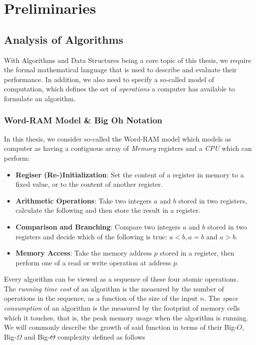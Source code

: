 \clearpage

\def\chaptertitle{Preliminaries}

\lhead{\emph{\chaptertitle}}

\chapter{\chaptertitle}
\label{ch:preliminaries}

\section{Analysis of Algorithms}
\label{sec:anaylsis-of-algorithms}

With Algorithms and Data Structures being a core topic of this thesis, we require the formal mathematical language that is used to describe and evaluate their performance. In addition, we also need to specify a so-called model of computation, which defines the set of \textit{operations} a computer has available to formulate an algorithm.

\subsection{Word-RAM Model \& Big Oh Notation}
In this thesis, we consider so-called the Word-RAM model \cite{DBLP:conf/stoc/FredmanW90} which models as computer as having a contiguous array of \textit{Memory} registers and a \textit{CPU} which can perform: 
\begin{itemize}
    \item \textbf{Regiser (Re-)Initialization}: Set the content of a register in memory to a fixed value, or to the content of another register.
    \item \textbf{Arithmetic Operations}: Take two integers $a$ and $b$ stored in two registers, calculate the following and then store the result in a register.
    \item \textbf{Comparison and Branching}: Compare two integers $a$ and $b$ stored in two registers and decide which of the following is true: $a<b, a=b$ and $a>b$.
    \item \textbf{Memory Access}: Take the memory address $p$ stored in a register, then perform one of a read or write operation at address $p$.
\end{itemize}

Every algorithm can be viewed as a sequence of these four atomic operations. The \textit{running time cost} of an algorithm is the measured by the number of operations in the sequence, as a function of the size of the input $n$. The \textit{space consumption} of an algorithm is the measured by the footprint of memory cells which it touches, that is, the peak memory usage when the algorithm is running. We will commonly describe the growth of said function in terms of their Big-$O$, Big-$\Omega$ and Big-$\Theta$ complexity defined as follows

